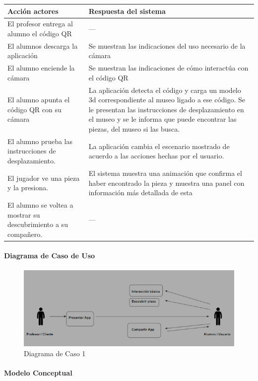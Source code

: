 \begin{longtable}{|p{5cm}|p{8cm}|}
\hline 
Acción actores & Respuesta del sistema \\ 
\hline 
El profesor entrega al alumno el código QR & --- \\ 
\hline
El alumnos descarga la aplicación & Se muestran las indicaciones del uso necesario de la cámara \\ 
\hline 
El alumno enciende la cámara  & Se muestran las indicaciones de cómo interactúa con el código QR \\ 
\hline
El alumno apunta el código QR con su cámara & La aplicación detecta el código y carga un modelo 3d correspondiente al museo ligado a ese código.
Se le presentan las instrucciones de desplazamiento en el museo y se le informa que puede encontrar las piezas, del museo si las busca.
 \\ 
\hline
El alumno prueba las instrucciones de desplazamiento. & La aplicación cambia el escenario mostrado de acuerdo a las acciones hechas por el usuario. \\ 
\hline
El jugador ve una pieza y la presiona. & El sistema muestra una animación que confirma el haber encontrado la pieza y muestra una panel con información más detallada de esta \\ 
\hline
El alumno se voltea a mostrar su descubrimiento a su compañero. & --- \\ 
\hline
\end{longtable}

\paragraph{Diagrama de Caso de Uso}

\begin{figure}[H]
\centerline{\includegraphics[width=15cm]{imgs/CasoUso_1.PNG}}
\caption{Diagrama de Caso 1}
\label{fig_1}
\end{figure}

\paragraph{Modelo Conceptual}

